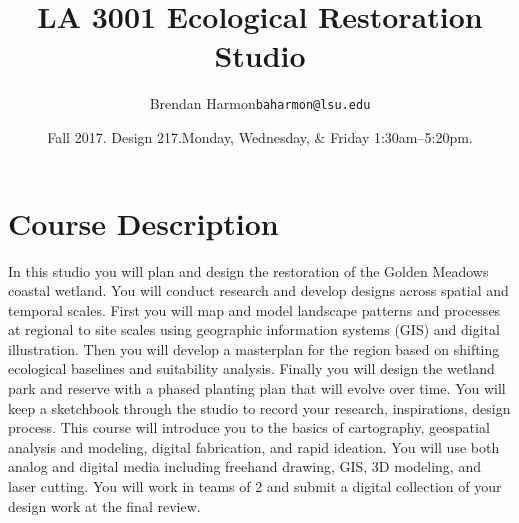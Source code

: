 \documentclass[11pt,article,oneside]{memoir}
\makeatletter
\def\myauthor{Author}
\def\mytitle{Title}
\def\myemail{baharmon@lsu.edu} %
\def\myauthor{Brendan Harmon}
\def\mytitle{{\normalsize \textsc{LA} 3001\newline} \huge \bfseries 
Ecological Restoration Studio}
\makeatother
\begin{document}
\setlength\bibitemsep{0.75em}

\setmainfont[Scale=1, Path = fonts/lato/,BoldItalicFont=Lato-RegIta,BoldFont=Lato-Reg,ItalicFont=Lato-LigIta]{Lato-Lig}
\setsansfont[Scale=1, Path = fonts/lato/,BoldItalicFont=Lato-RegIta,BoldFont=Lato-Reg,ItalicFont=Lato-LigIta]{Lato-Lig}
\setmonofont[Mapping=tex-text,Scale=0.8,Path = fonts/inconsolata/]{i}

\def\ind{\hangindent=1 true cm\hangafter=1 \noindent}
\def\labelitemi{$\cdot$}
\title{\LARGE \mytitle}     
\author{\Large\myauthor \newline \footnotesize\texttt{\noindent\myemail}}
\date{Fall 2017. Design 217.\newline Monday, Wednesday, \& Friday 1:30am--5:20pm.}
\published{\,}



%
%


\vspace*{-10em}
\maketitle

\section{Course Description}

In this studio you will plan and design the restoration 
of the Golden Meadows coastal wetland. 
%
You will conduct research and develop designs 
across spatial and temporal scales.
%
First you will map and model landscape patterns and processes 
at regional to site scales using geographic information systems (GIS) 
and digital illustration. 
Then you will develop a masterplan for the region based on
shifting ecological baselines and suitability analysis.
Finally you will design the wetland park and reserve
with a phased planting plan that will evolve over time. 
%
You will keep a sketchbook through the studio 
to record your research, inspirations, design process.
%
This course will introduce you to the basics of cartography, 
geospatial analysis and modeling, digital fabrication,
and rapid ideation.
You will use both analog and digital media including
freehand drawing, GIS, 3D modeling, 
and laser cutting.
%
You will work in teams of 2 
and submit a digital collection of your design work
at the final review. \\
\end{document}
